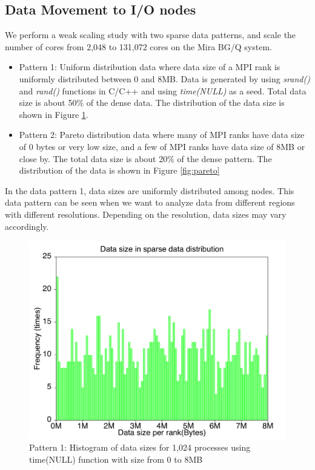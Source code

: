 
\subsection{Data Movement to I/O nodes}
We perform a weak scaling study with two sparse data patterns, and scale the number of cores from 2,048 to 131,072 cores on the Mira BG/Q system. 

\begin{itemize}
\item Pattern 1: Uniform distribution data where data size of a MPI rank is uniformly distributed between 0 and 8MB.  Data is generated by using \textit{srand()} and \textit{rand()} functions in C/C++ and using \textit{time(NULL)} as a seed.  Total data size is about 50\% of the dense data. The distribution of the data size is shown in Figure \ref{fig:uniform}.
\item Pattern 2: Pareto distribution data where many of MPI ranks have data size of 0 bytes or very low size, and a few of MPI ranks have data size of 8MB or close by. The total data size is about 20\% of the dense pattern. The distribution of the data is shown in Figure \ref{fig:pareto}
\end{itemize}

In the data pattern 1, data sizes are uniformly distributed among nodes. This data pattern can be seen when we want to analyze data from different regions with different resolutions. Depending on the resolution, data sizes may vary accordingly.

\begin{figure}[!htb]
\vspace{-0.2in}
\centering
\includegraphics[scale=0.3]{figures/uniform.pdf}
\caption{Pattern 1: Histogram of data sizes for 1,024 processes using time(NULL) function with size from 0 to 8MB}
\label{fig:uniform}
\vspace{-0.1in}
\end{figure}

